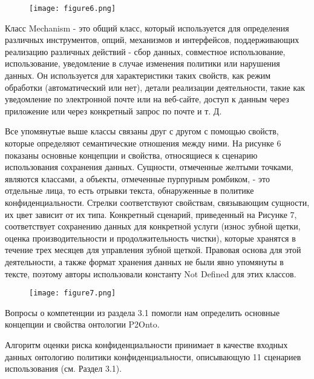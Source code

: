 \documentclass[../main]{subfiles}
\begin{document}
\begin{figure}[H]
    \centering
    {\texttt{[image: figure6.png]}}
    \vspace{-\baselineskip}
\end{figure}

Класс Mechanism - это общий класс, который используется для определения различных инструментов, опций, механизмов и интерфейсов, поддерживающих реализацию различных действий - сбор данных, совместное использование, использование, уведомление в случае изменения политики или нарушения данных. Он используется для характеристики таких свойств, как режим обработки (автоматический или нет), детали реализации деятельности, такие как уведомление по электронной почте или на веб-сайте, доступ к данным через приложение или через конкретный запрос по почте и т. Д.

Все упомянутые выше классы связаны друг с другом с помощью свойств, которые определяют семантические отношения между ними. На рисунке 6 показаны основные концепции и свойства, относящиеся к сценарию использования сохранения данных. Сущности, отмеченные желтыми точками, являются классами, а объекты, отмеченные пурпурным ромбиком, - это отдельные лица, то есть отрывки текста, обнаруженные в политике конфиденциальности. Стрелки соответствуют свойствам, связывающим сущности, их цвет зависит от их типа. Конкретный сценарий, приведенный на Рисунке 7, соответствует сохранению данных для конкретной услуги (износ зубной щетки, оценка производительности и продолжительность чистки), которые хранятся в течение трех месяцев для управления зубной щеткой. Правовая основа для этой деятельности, а также формат хранения данных не были явно упомянуты в тексте, поэтому авторы использовали константу Not Defined для этих классов. 

\begin{figure}[H]
    \centering
    {\texttt{[image: figure7.png]}}
    \vspace{-\baselineskip}
\end{figure}

Вопросы о компетенции из раздела 3.1 помогли нам определить основные концепции и свойства онтологии P2Onto.

Алгоритм оценки риска конфиденциальности принимает в качестве входных данных онтологию политики конфиденциальности, описывающую 11 сценариев использования (см. Раздел 3.1).
\end{document}
